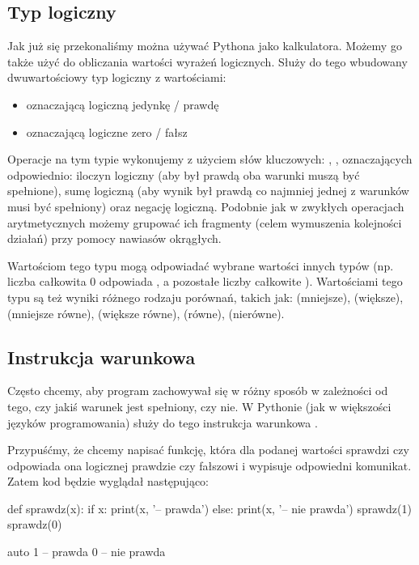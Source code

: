 \subsection{Typ logiczny}

Jak już się przekonaliśmy można używać Pythona jako kalkulatora. Możemy go także użyć do obliczania wartości wyrażeń logicznych. Służy do tego wbudowany dwuwartościowy typ logiczny z wartościami:
\begin{itemize}
\item {} oznaczającą logiczną jedynkę / prawdę
\item {} oznaczającą logiczne zero / fałsz
\end{itemize}
Operacje na tym typie wykonujemy z użyciem słów kluczowych: , ,  oznaczających odpowiednio:
iloczyn logiczny (aby był prawdą oba warunki muszą być spełnione), sumę logiczną (aby wynik był prawdą co najmniej jednej z warunków musi być spełniony) oraz negację logiczną.
Podobnie jak w zwykłych operacjach arytmetycznych możemy grupować ich fragmenty (celem wymuszenia kolejności działań) przy pomocy nawiasów okrągłych.

Wartościom tego typu mogą odpowiadać wybrane wartości innych typów (np. liczba całkowita 0 odpowiada , a pozostałe liczby całkowite ).
Wartościami tego typu są też wyniki różnego rodzaju porównań, takich jak: \python{<} (mniejsze), \python{>} (większe), \python{<=} (mniejsze równe),
\python{>=} (większe równe), \python{==} (równe), \python{!=} (nierówne).

\subsection{Instrukcja warunkowa }

Często chcemy, aby program zachowywał się w różny sposób w zależności od tego, czy jakiś warunek jest spełniony, czy nie.
W Pythonie (jak w większości języków programowania) służy do tego instrukcja warunkowa .

Przypuśćmy, że chcemy napisać funkcję, która dla podanej wartości sprawdzi czy odpowiada ona logicznej prawdzie czy fałszowi i wypisuje odpowiedni komunikat.
Zatem kod będzie wyglądał następująco:

\begin{CodeFrame}[python]{0.50\textwidth}
def sprawdz(x):
    if x:
        print(x, '-- prawda')
    else:
        print(x, '-- nie prawda')
sprawdz(1)
sprawdz(0)
\end{CodeFrame}
\begin{CodeFrame}{auto}
1 -- prawda
0 -- nie prawda
\end{CodeFrame}

